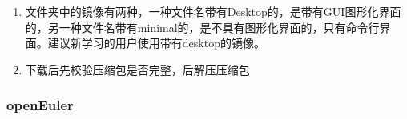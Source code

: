 \begin{enumerate}
\item
  文件夹中的镜像有两种，一种文件名带有Desktop的，是带有GUI图形化界面的，另一种文件名带有minimal的，是不具有图形化界面的，只有命令行界面。建议新学习的用户使用带有desktop的镜像。
\item
  下载后先校验压缩包是否完整，后解压压缩包
\end{enumerate}

\subsubsection{openEuler}\label{openeuler}

